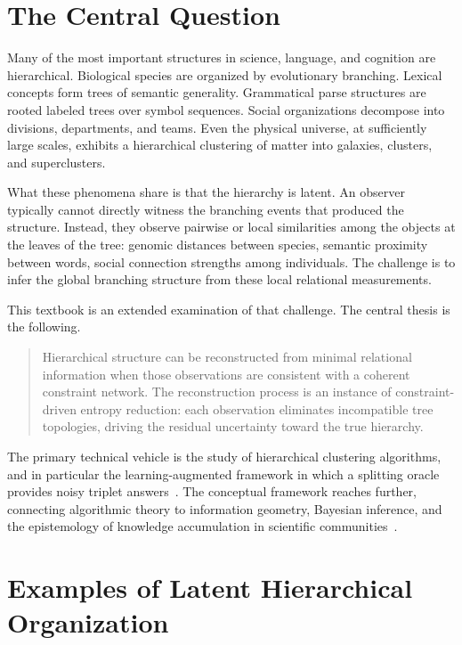 \section{The Central Question}

Many of the most important structures in science, language, and cognition are hierarchical. Biological species are organized by evolutionary branching. Lexical concepts form trees of semantic generality. Grammatical parse structures are rooted labeled trees over symbol sequences. Social organizations decompose into divisions, departments, and teams. Even the physical universe, at sufficiently large scales, exhibits a hierarchical clustering of matter into galaxies, clusters, and superclusters.

What these phenomena share is that the hierarchy is latent. An observer typically cannot directly witness the branching events that produced the structure. Instead, they observe pairwise or local similarities among the objects at the leaves of the tree: genomic distances between species, semantic proximity between words, social connection strengths among individuals. The challenge is to infer the global branching structure from these local relational measurements.

This textbook is an extended examination of that challenge. The central thesis is the following.

\begin{quote}
Hierarchical structure can be reconstructed from minimal relational information when those observations are consistent with a coherent constraint network. The reconstruction process is an instance of constraint-driven entropy reduction: each observation eliminates incompatible tree topologies, driving the residual uncertainty toward the true hierarchy.
\end{quote}

The primary technical vehicle is the study of hierarchical clustering algorithms, and in particular the learning-augmented framework in which a splitting oracle provides noisy triplet answers~\cite{Dasgupta2016,MoseleyWang2017}. The conceptual framework reaches further, connecting algorithmic theory to information geometry, Bayesian inference, and the epistemology of knowledge accumulation in scientific communities~\cite{Ioannidis2005,OpenScienceCollaboration2015}.

\section{Examples of Latent Hierarchical Organization}

